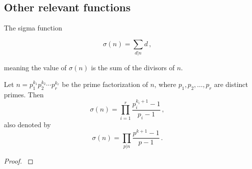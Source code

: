 \documentclass{article}
\begin{document}
\subsection{Other relevant functions}

\begin{definition}
The sigma function \cite{HW:sigma}

\begin{equation*}
    \sigma(n)=\sum_{d\vert n} d\,,
\end{equation*}

meaning the value of $\sigma(n)$ is the sum of the divisors of $n$.
\end{definition}

\begin{lemma}
\label{lemma:sigma}
Let $n=p_1^{k_1}p_2^{k_2}\cdots p_r^{k_r}$ be the prime factorization of $n$, where $p_1,p_2,\dots,p_r$ are distinct primes. Then
\begin{equation*}
    \sigma(n)=\prod_{i=1}^r \frac{p_i^{k_i+1}-1}{p_i-1}\,,
\end{equation*}
also denoted by
\begin{equation*}
    \sigma(n) = \prod_{p\vert n} \frac{p^{k+1}-1}{p-1}\,.
\end{equation*}

\begin{proof}
\cite{HW:sigma}
\end{proof}
\end{lemma}
\end{document}
